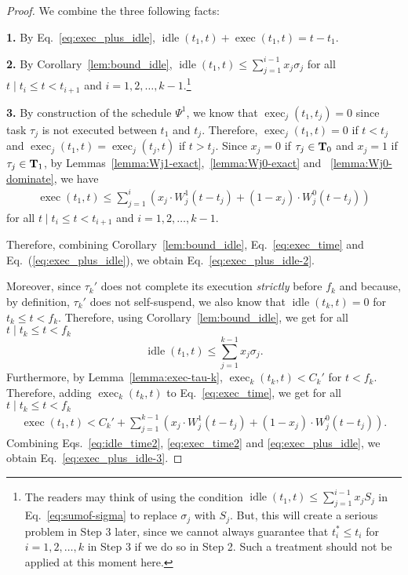 \begin{proof}
We combine the three following facts:

\noindent\textbf{1.} By Eq.~\eqref{eq:exec_plus_idle}, $\operatorname{idle}(t_1, t)+\operatorname{exec}(t_1, t) = t-t_1$.

\noindent\textbf{2.} By Corollary~\ref{lem:bound_idle}, $\operatorname{idle}(t_1, t) \leq \sum_{j=1}^{i-1}
x_j \sigma_j $ for all $t \mid t_{i} \leq t < t_{i+1}$ and $i=1,2,\ldots,k-1$.\footnote{\label{footnote-why-sigma}The readers
  may think of using the condition $\operatorname{idle}(t_1, t) \leq
  \sum_{j=1}^{i-1} x_j S_j$ in Eq.~\eqref{eq:sumof-sigma} to
  replace $\sigma_j$ with $S_j$. But, this will create a serious
  problem in Step 3 later, since we cannot always guarantee that
  $t_i^*\leq t_i$ for $i=1,2,\ldots,k$ in Step 3 if we do so in Step 2. Such a treatment should not be applied at this moment here.}

\noindent\textbf{3.} By construction of the
schedule $\Psi^1$, we know that $\operatorname{exec}_j(t_1, t_j)=0$ since task $\tau_j$ is not executed between $t_1$ and $t_j$. Therefore, $\operatorname{exec}_j(t_1, t)=0$ if $t<t_j$ and $\operatorname{exec}_j(t_1, t)=\operatorname{exec}_j(t_j, t)$ if $t > t_j$. Since $x_j = 0$ if $\tau_j \in {\bf T}_0$ and $x_j = 1$ if $\tau_j \in {\bf T}_1$, by Lemmas~\ref{lemma:Wj1-exact},~\ref{lemma:Wj0-exact} and ~\ref{lemma:Wj0-dominate}, we have
{\footnotesize \begin{align}
\label{eq:exec_time}
\operatorname{exec}(t_1, t) \leq \sum_{j=1}^{i} \left( x_j\cdot W_j^1(t-t_j)  + (1-x_j)\cdot W_j^0(t-t_j) \right)
\end{align}} 
for all $t \mid t_{i} \leq t < t_{i+1}$ and $i=1,2,\ldots,k-1$.

Therefore, combining Corollary~\ref{lem:bound_idle}, Eq.~\eqref{eq:exec_time} and Eq.~(\ref{eq:exec_plus_idle}), we obtain Eq.~\eqref{eq:exec_plus_idle-2}. 

Moreover, since $\tau_k'$ does not complete its execution
\emph{strictly} before $f_k$ and because, by definition, $\tau_k'$
does not self-suspend, we also know that $\operatorname{idle}(t_k, t) = 0$ for $t_k \leq t < f_k$. Therefore, using Corollary~\ref{lem:bound_idle}, we get for all $t \mid t_k \leq t < f_k$ 
\begin{equation}
\label{eq:idle_time2}
\operatorname{idle}(t_1, t) \leq \sum_{j=1}^{k-1}
x_j \sigma_j.
\end{equation}
Furthermore, by Lemma~\ref{lemma:exec-tau-k}, $\operatorname{exec}_k(t_k, t) < C_k'$ for $t < f_k$. Therefore, adding $\operatorname{exec}_k(t_k, t)$ to Eq.~\eqref{eq:exec_time}, we get for all $t \mid t_{k} \leq t < f_k$ 
{\footnotesize \begin{align}
\label{eq:exec_time2}
\operatorname{exec}(t_1, t) < C_k' + \sum_{j=1}^{k-1} \left( x_j\cdot W_j^1(t-t_j)  + (1-x_j)\cdot W_j^0(t-t_j) \right).
\end{align}}
Combining Eqs.~\eqref{eq:idle_time2}, \eqref{eq:exec_time2} and \eqref{eq:exec_plus_idle}, we obtain Eq.~\eqref{eq:exec_plus_idle-3}.
\end{proof}




